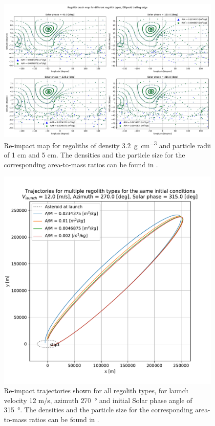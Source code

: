 \FloatBarrier
\begin{figure}[htb]
\centering
\captionsetup{justification=centering}
\includegraphics[angle=90, width=\textwidth, height=\textheight, keepaspectratio=true]{trailing_edge_perturbations/crashMap_3P2_density_1cm_5cm_radius.pdf}
\caption{Re-impact map for regoliths of density \SI{3.2}{\gram\per\centi\metre\cubed} and particle radii of 1 cm and 5 cm. The densities and the particle size for the corresponding area-to-mass ratios can be found in .}
\label{fig:trailingEdge_crashmap_3P2_density_1cm_5cm_radius}
\end{figure}
\FloatBarrier
\begin{figure}[htb]
\centering
\captionsetup{justification=centering}
\includegraphics[width=\textwidth, height=0.5\textheight, keepaspectratio=true]{trailing_edge_perturbations/reimpact_traj_12ms_270Azim_315solarPhase.pdf}
\caption{Re-impact trajectories shown for all regolith types, for launch velocity 12 m/s, azimuth \SI{270}{\degree} and initial Solar phase angle of \SI{315}{\degree}. The densities and the particle size for the corresponding area-to-mass ratios can be found in .}
\label{fig:trailingEdge_reimpact_traj_12ms_270azim_315solar}
\end{figure}

